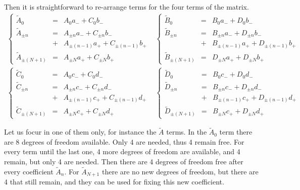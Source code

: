 \documentclass[aps,amssymb,amsmath,amsfonts,pra,superscriptaddress,onecolumn]{revtex4}
\begin{document}
Then it is straightforward to re-arrange terms for the four terms of the matrix. 
\begin{eqnarray}
\left\lbrace
\begin{matrix}
\tilde{A}_0 & = & A_0 a_- + C_0 b_- \\
\tilde{A}_{\pm n} & = & A_{\pm n} a_- + C_{\pm n} b_-\\
 & + & A_{\pm (n-1)} a_+ + C_{\pm (n-1)} b_+ \\
\tilde{A}_{\pm (N + 1)} & = & A_{\pm N} a_+ + C_{\pm N} b_+
\end{matrix}
\right.
& 
\left\lbrace
\begin{matrix}
\tilde{B}_0 & = & B_0 a_- + D_0 b_- \\
\tilde{B}_{\pm n} & = & B_{\pm n} a_- + D_{\pm n} b_-\\
 & + & B_{\pm (n-1)} a_+ + D_{\pm (n-1)} b_+ \\
\tilde{B}_{\pm (N + 1)} & = & D_{\pm N} a_+ + D_{\pm N} b_+
\end{matrix}
\right. \\
\left\lbrace
\begin{matrix}
\tilde{C}_0 & = & A_0 c_- + C_0 d_- \\
\tilde{C}_{\pm n} & = & A_{\pm n} c_- + C_{\pm n} d_-\\
 & + & A_{\pm (n-1)} c_+ + C_{\pm (n-1)} d_+ \\
\tilde{C}_{\pm (N + 1)} & = & A_{\pm N} c_+ + C_{\pm N} d_+
\end{matrix}
\right.
& 
\left\lbrace
\begin{matrix}
\tilde{D}_0 & = & B_0 c_- + D_0 d_- \\
\tilde{D}_{\pm n} & = & B_{\pm n} c_- + D_{\pm n} d_-\\
 & + & B_{\pm (n-1)} c_+ + D_{\pm (n-1)} d_+ \\
\tilde{D}_{\pm (N + 1)} & = & B_{\pm N} c_+ + D_{\pm N} d_+
\end{matrix}
\right.
\end{eqnarray}

Let us focur in one of them only, for instance the $\tilde A$ terms. In the $\tilde{A}_{0}$ term there are 8 degrees of freedom available. Only 4 are needed, thus 4 remain free. For every term until the last one, 4 more degrees of freedom are available, and 4 remain, but only 4 are needed. Then there are 4 degrees of freedom free after every coefficient $\tilde{A}_n$. For $\tilde{A}_{N + 1}$ there are no new degrees of freedom, but there are 4 that still remain, and they can be used for fixing this new coefficient. 
\end{document}
